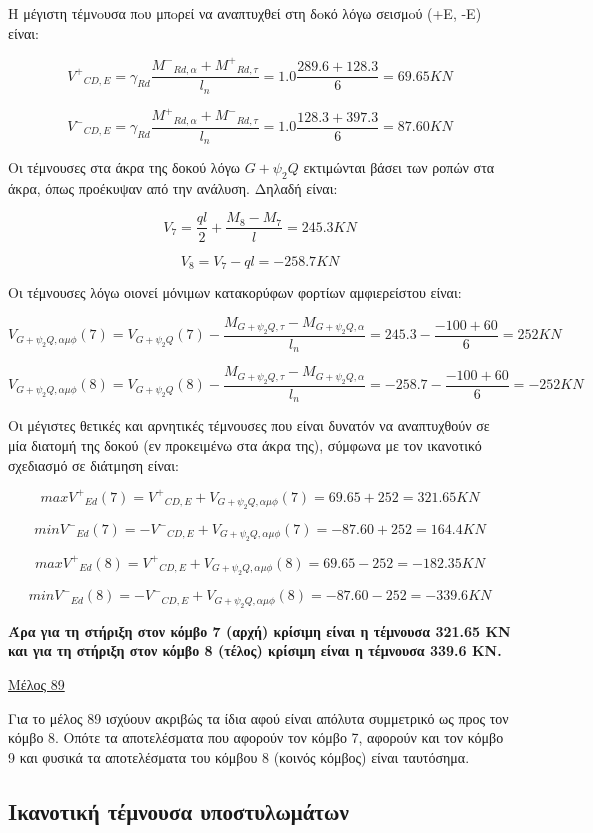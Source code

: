 \bigskip

\noindent
Η μέγιστη τέμνoυσα πoυ μπoρεί να αναπτυχθεί στη δoκό λόγω σεισμoύ (+E, -E) είναι:

\[
{V^{+}}_{CD,E} = \gamma_{Rd}\dfrac{{M^{-}}_{Rd,\alpha} + {M^{+}}_{Rd,\tau}}{l_n} = 1.0\dfrac{289.6 + 128.3}{6} = 69.65 KN
\]

\[
{V^{-}}_{CD,E} = \gamma_{Rd}\dfrac{{M^{+}}_{Rd,\alpha} + {M^{-}}_{Rd,\tau}}{l_n} = 1.0\dfrac{128.3 + 397.3}{6} = 87.60 KN
\]

\noindent
Οι τέμνουσες στα άκρα της δοκού λόγω $G+\psi_2Q$ εκτιμώνται βάσει των ροπών στα άκρα, όπως προέκυψαν από την ανάλυση. Δηλαδή είναι:

\[
V_7 = \dfrac{ql}{2} + \dfrac{M_8 - Μ_7}{l} = 245.3 KN
\]

\[
V_8 = V_7 - ql = -258.7 KN
\]

\noindent
Οι τέμνουσες λόγω οιονεί μόνιμων κατακορύφων φορτίων αμφιερείστου είναι:

\[
V_{G+\psi_2Q,\alpha\mu\phi}(7) = V_{G+\psi_2Q}(7) - \dfrac{M_{G+\psi_2Q,\tau}- M_{G+\psi_2Q,\alpha}}{l_n} = 245.3 - \dfrac{-100+60}{6}= 252KN
\]

\[
V_{G+\psi_2Q,\alpha\mu\phi}(8) = V_{G+\psi_2Q}(8) - \dfrac{M_{G+\psi_2Q,\tau}- M_{G+\psi_2Q,\alpha}}{l_n} = -258.7 - \dfrac{-100+60}{6}= -252KN
\]

\noindent
Οι μέγιστες θετικές και αρνητικές τέμνουσες που είναι δυνατόν να αναπτυχθούν σε μία διατομή της δοκού (εν προκειμένω στα άκρα της), σύμφωνα με τον ικανοτικό σχεδιασμό σε διάτμηση είναι:

\[
max{V^{+}}_{Ed} (7) = {V^{+}}_{CD,E} + V_{G+\psi_2Q,\alpha\mu\phi}(7) = 69.65 + 252 = 321.65 KN
\]

\[
min{V^{-}}_{Ed} (7) = -{V^{-}}_{CD,E} + V_{G+\psi_2Q,\alpha\mu\phi}(7) = -87.60 + 252 = 164.4 KN
\]

\[
max{V^{+}}_{Ed} (8) = {V^{+}}_{CD,E} + V_{G+\psi_2Q,\alpha\mu\phi}(8) = 69.65 - 252 = -182.35 KN
\]

\[
min{V^{-}}_{Ed} (8) = -{V^{-}}_{CD,E} + V_{G+\psi_2Q,\alpha\mu\phi}(8) = -87.60 - 252 = -339.6 KN
\]

\bigskip

\noindent\textbf{\textcolor{mygreen}{Άρα για τη στήριξη στον κόμβο 7 (αρχή) κρίσιμη είναι η τέμνουσα 321.65 KN και για τη στήριξη στον κόμβο 8 (τέλος) κρίσιμη είναι η τέμνουσα 339.6 KN.}}

\bigskip

\noindent
\underline{Μέλος 89}

\bigskip

\noindent
Για το μέλος 89 ισχύουν ακριβώς τα ίδια αφού είναι απόλυτα συμμετρικό ως προς τον κόμβο 8. Οπότε τα αποτελέσματα που αφορούν τον κόμβο 7, αφορούν και τον κόμβο 9 και φυσικά τα αποτελέσματα του κόμβου 8 (κοινός κόμβος) είναι ταυτόσημα.

\subsection{Ικανοτική τέμνουσα υποστυλωμάτων}

